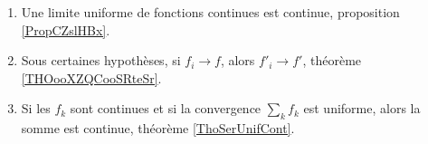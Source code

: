 
	\label{THEMEooSuitesFonctions}
\begin{enumerate}
	\item
	      Une limite uniforme de fonctions continues est continue, proposition \ref{PropCZslHBx}.
	\item
	      Sous certaines hypothèses, si \( f_i\to f\), alors \( f'_i\to f'\), théorème \ref{THOooXZQCooSRteSr}.
	\item
	      Si les \( f_k\) sont continues et si la convergence \( \sum_kf_k\) est uniforme, alors la somme est continue, théorème \ref{ThoSerUnifCont}.
\end{enumerate}
